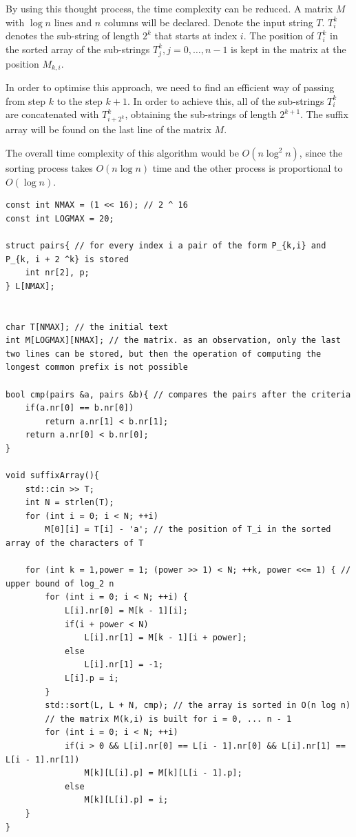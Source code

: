 \documentclass[letterpaper]{article}
\begin{document}
\newpage

By using this thought process, the time complexity can be reduced. A matrix $M$ with $\log n$ lines and $n$ columns will be declared. Denote the input string $T$. $T_{i}^k$ denotes the sub-string of length $2^k$ that starts at index $i$. The position of $T_{i}^{k}$ in the sorted array of the sub-strings $T_{j}^{k}, j = 0, \dots, n - 1$ is kept in the matrix at the position $M_{k,i}$.

In order to optimise this approach, we need to find an efficient way of passing from step $k$ to the step $k + 1$. In order to achieve this, all of the sub-strings $T_{i}^{k}$ are concatenated with $T_{i + 2 ^k}^k$, obtaining the sub-strings of length $2^{k + 1}$. The suffix array will be found on the last line of the matrix $M$.

The overall time complexity of this algorithm would be $O(n \log ^2 n)$, since the sorting process takes $O(n \log n)$ time and the other process is proportional to $O(\log n)$.

\begin{lstlisting}
const int NMAX = (1 << 16); // 2 ^ 16
const int LOGMAX = 20;

struct pairs{ // for every index i a pair of the form P_{k,i} and P_{k, i + 2 ^k} is stored
    int nr[2], p;
} L[NMAX];


char T[NMAX]; // the initial text
int M[LOGMAX][NMAX]; // the matrix. as an observation, only the last two lines can be stored, but then the operation of computing the longest common prefix is not possible

bool cmp(pairs &a, pairs &b){ // compares the pairs after the criteria
    if(a.nr[0] == b.nr[0])
        return a.nr[1] < b.nr[1];
    return a.nr[0] < b.nr[0];
}

void suffixArray(){
    std::cin >> T;
    int N = strlen(T);
    for (int i = 0; i < N; ++i)
        M[0][i] = T[i] - 'a'; // the position of T_i in the sorted array of the characters of T

    for (int k = 1,power = 1; (power >> 1) < N; ++k, power <<= 1) { // upper bound of log_2 n
        for (int i = 0; i < N; ++i) {
            L[i].nr[0] = M[k - 1][i];
            if(i + power < N)
                L[i].nr[1] = M[k - 1][i + power];
            else
                L[i].nr[1] = -1;
            L[i].p = i;
        }
        std::sort(L, L + N, cmp); // the array is sorted in O(n log n)
        // the matrix M(k,i) is built for i = 0, ... n - 1
        for (int i = 0; i < N; ++i)
            if(i > 0 && L[i].nr[0] == L[i - 1].nr[0] && L[i].nr[1] == L[i - 1].nr[1])
                M[k][L[i].p] = M[k][L[i - 1].p];
            else
                M[k][L[i].p] = i;
    }
}
\end{lstlisting}
\end{document}
